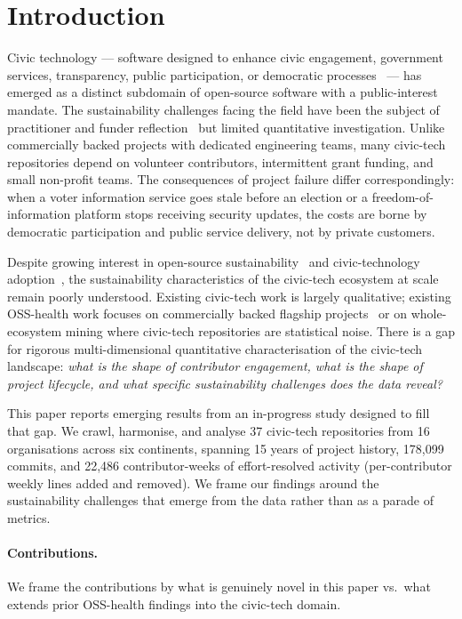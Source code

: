 \documentclass[a4paper,UKenglish,cleveref,autoref,thm-restate]{lipics-v2021}
\begin{document}
\section{Introduction}\label{sec:intro}

Civic technology --- software designed to enhance civic engagement, government services, transparency, public participation, or democratic processes~\cite{Patel2013,McNutt2016,Schrock2019} --- has emerged as a distinct subdomain of open-source software with a public-interest mandate. The sustainability challenges facing the field have been the subject of practitioner and funder reflection~\cite{Knight2017} but limited quantitative investigation. Unlike commercially backed projects with dedicated engineering teams, many civic-tech repositories depend on volunteer contributors, intermittent grant funding, and small non-profit teams. The consequences of project failure differ correspondingly: when a voter information service goes stale before an election or a freedom-of-information platform stops receiving security updates, the costs are borne by democratic participation and public service delivery, not by private customers.

Despite growing interest in open-source sustainability~\cite{Eghbal2020,Goggins2021} and civic-technology adoption~\cite{Patel2013,McNutt2016}, the sustainability characteristics of the civic-tech ecosystem at scale remain poorly understood. Existing civic-tech work is largely qualitative; existing OSS-health work focuses on commercially backed flagship projects~\cite{Avelino2016,Coelho2017} or on whole-ecosystem mining where civic-tech repositories are statistical noise. There is a gap for rigorous multi-dimensional quantitative characterisation of the civic-tech landscape: \emph{what is the shape of contributor engagement, what is the shape of project lifecycle, and what specific sustainability challenges does the data reveal?}

This paper reports emerging results from an in-progress study designed to fill that gap. We crawl, harmonise, and analyse 37 civic-tech repositories from 16 organisations across six continents, spanning 15 years of project history, 178{,}099 commits, and 22{,}486 contributor-weeks of effort-resolved activity (per-contributor weekly lines added and removed). We frame our findings around the sustainability challenges that emerge from the data rather than as a parade of metrics.

\paragraph{Contributions.}
We frame the contributions by what is genuinely novel in this paper vs.\ what extends prior OSS-health findings into the civic-tech domain.
\end{document}
